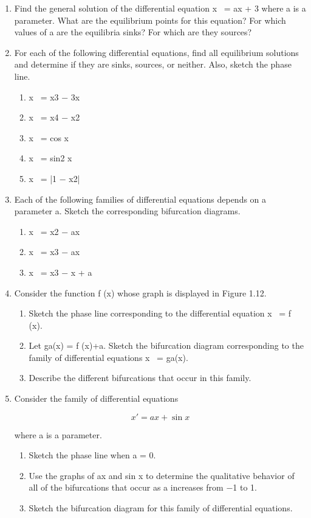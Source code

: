 \documentclass{article}
\begin{document}
\begin{enumerate}
\item Find the general solution of the differential equation x  = ax + 3 where
a is a parameter. What are the equilibrium points for this equation? For
which values of a are the equilibria sinks? For which are they sources?

\item For each of the following differential equations, find all equilibrium
solutions and determine if they are sinks, sources, or neither. Also, sketch
the phase line.

\begin{enumerate}
\item  x  = x3 − 3x
\item  x  = x4 − x2
\item  x  = cos x
\item  x  = sin2 x
\item  x  = |1 − x2|
\end{enumerate}

\item Each of the following families of differential equations depends on a
parameter a. Sketch the corresponding bifurcation diagrams.

\begin{enumerate}
\item  x  = x2 − ax
\item x  = x3 − ax
\item  x  = x3 − x + a
\end{enumerate}

\item Consider the function f (x) whose graph is displayed in Figure 1.12.

\begin{enumerate}
\item Sketch the phase line corresponding to the differential equation x  =
f (x).
\item Let ga(x) = f (x)+a. Sketch the bifurcation diagram corresponding
to the family of differential equations x  = ga(x).
\item Describe the different bifurcations that occur in this family.
\end{enumerate}

\item Consider the family of differential equations

\[
x'  = ax + \sin x
\]

where a is a parameter.

\begin{enumerate}
\item Sketch the phase line when a = 0.
\item Use the graphs of ax and sin x to determine the qualitative behavior
of all of the bifurcations that occur as a increases from −1 to 1.
\item Sketch the bifurcation diagram for this family of differential
equations.
\end{enumerate}


\end{enumerate}
\end{document}
